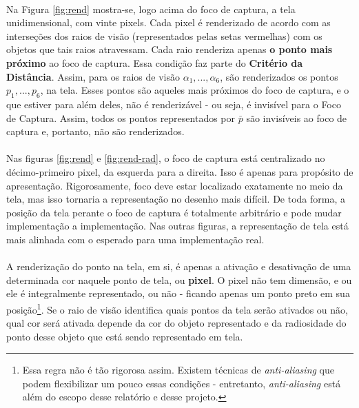 \documentclass{article}
\begin{document}
	\paragraph{}
    Na Figura \ref{fig:rend} mostra-se, logo acima do foco de captura, a tela unidimensional, com vinte pixels. Cada pixel é renderizado de acordo com as interseções dos raios de visão (representados pelas setas vermelhas) com os objetos que tais raios atravessam. Cada raio renderiza apenas \textbf{o ponto mais próximo} ao foco de captura. Essa condição faz parte do \textbf{Critério da Distância}. Assim, para os raios de visão $\alpha_1, ..., \alpha_6$, são renderizados os pontos $p_1, ..., p_6$, na tela. Esses pontos são aqueles mais próximos do foco de captura, e o que estiver para além deles, não é renderizável - ou seja, é invisível para o Foco de Captura. Assim, todos os pontos representados por $\bar{p}$ são invisíveis ao foco de captura e, portanto, não são renderizados.
    
    \paragraph{}
    Nas figuras \ref{fig:rend} e \ref{fig:rend-rad}, o foco de captura está centralizado no décimo-primeiro pixel, da esquerda para a direita. Isso é apenas para propósito de apresentação. Rigorosamente, foco deve estar localizado exatamente no meio da tela, mas isso tornaria a representação no desenho mais difícil. De toda forma, a posição da tela perante o foco de captura é totalmente arbitrário e pode mudar implementação a implementação. Nas outras figuras, a representação de tela está mais alinhada com o esperado para uma implementação real.
    
    \paragraph{}
    A renderização do ponto na tela, em si, é apenas a ativação e desativação de uma determinada cor naquele ponto de tela, ou \textbf{pixel}. O pixel não tem dimensão, e ou ele é integralmente representado, ou não - ficando apenas um ponto preto em sua posição\footnote{Essa regra não é tão rigorosa assim. Existem técnicas de \textit{anti-aliasing} que podem flexibilizar um pouco essas condições - entretanto, \textit{anti-aliasing} está além do escopo desse relatório e desse projeto.}. Se o raio de visão identifica quais pontos da tela serão ativados ou não, qual cor será ativada depende da cor do objeto representado e da radiosidade do ponto desse objeto que está sendo representado em tela.
    
\end{document}
